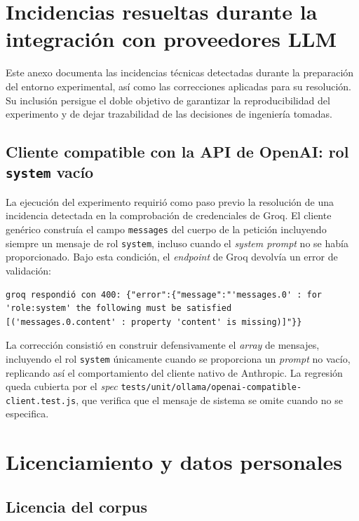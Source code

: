 \chapter{Incidencias resueltas durante la integración con proveedores LLM}
\label{anx:incidencias}

Este anexo documenta las incidencias técnicas detectadas durante la preparación
del entorno experimental, así como las correcciones aplicadas para su
resolución. Su inclusión persigue el doble objetivo de garantizar la
reproducibilidad del experimento y de dejar trazabilidad de las decisiones de
ingeniería tomadas.

\section{Cliente compatible con la API de OpenAI: rol \texttt{system} vacío}

La ejecución del experimento requirió como paso previo la resolución de una
incidencia detectada en la comprobación de credenciales de Groq. El cliente
genérico construía el campo \texttt{messages} del cuerpo de la petición
incluyendo siempre un mensaje de rol \texttt{system}, incluso cuando el
\textit{system prompt} no se había proporcionado. Bajo esta condición, el
\textit{endpoint} de Groq devolvía un error de validación:

\begin{verbatim}
groq respondió con 400: {"error":{"message":"'messages.0' : for
'role:system' the following must be satisfied
[('messages.0.content' : property 'content' is missing)]"}}
\end{verbatim}

La corrección consistió en construir defensivamente el \textit{array} de
mensajes, incluyendo el rol \texttt{system} únicamente cuando se proporciona un
\textit{prompt} no vacío, replicando así el comportamiento del cliente nativo
de Anthropic. La regresión queda cubierta por el \textit{spec}
\texttt{tests/unit/ollama/openai-compatible-client.test.js}, que verifica que
el mensaje de sistema se omite cuando no se especifica.

\chapter{Licenciamiento y datos personales}

\section{Licencia del corpus}

